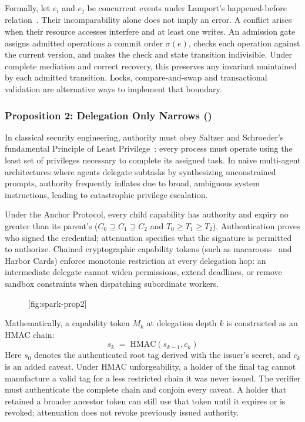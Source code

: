 Formally, let $e_i$ and $e_j$ be concurrent events under Lamport's happened-before relation~. Their incomparability alone does not imply an error. A conflict arises when their resource accesses interfere and at least one writes. An admission gate assigns admitted operations a commit order $\sigma(e)$, checks each operation against the current version, and makes the check and state transition indivisible. Under complete mediation and correct recovery, this preserves any invariant maintained by each admitted transition. Locks, compare-and-swap and transactional validation are alternative ways to implement that boundary.

\subsubsection*{Proposition 2: Delegation Only Narrows ()}
In classical security engineering, authority must obey Saltzer and Schroeder's fundamental Principle of Least Privilege~: every process must operate using the least set of privileges necessary to complete its assigned task. In naive multi-agent architectures where agents delegate subtasks by synthesizing unconstrained prompts, authority frequently inflates due to broad, ambiguous system instructions, leading to catastrophic privilege escalation.

Under the Anchor Protocol, every child capability has authority and expiry no greater than its parent's ($C_0 \supseteq C_1 \supseteq C_2$ and $T_0 \ge T_1 \ge T_2$). Authentication proves who signed the credential; attenuation specifies what the signature is permitted to authorize. Chained cryptographic capability tokens (such as macaroons~ and Harbor Cards) enforce monotonic restriction at every delegation hop: an intermediate delegate cannot widen permissions, extend deadlines, or remove sandbox constraints when dispatching subordinate workers.

\begin{figure}[tp]
  \centering
  [fig:spark-prop2]
\end{figure}

Mathematically, a capability token $M_k$ at delegation depth $k$ is constructed as an HMAC chain:
\begin{equation}
s_k \;=\; \mathrm{HMAC}(s_{k-1}, c_k)
\end{equation}
Here $s_0$ denotes the authenticated root tag derived with the issuer's secret, and $c_k$ is an added caveat. Under HMAC unforgeability, a holder of the final tag cannot manufacture a valid tag for a less restricted chain it was never issued. The verifier must authenticate the complete chain and conjoin every caveat. A holder that retained a broader ancestor token can still use that token until it expires or is revoked; attenuation does not revoke previously issued authority.

